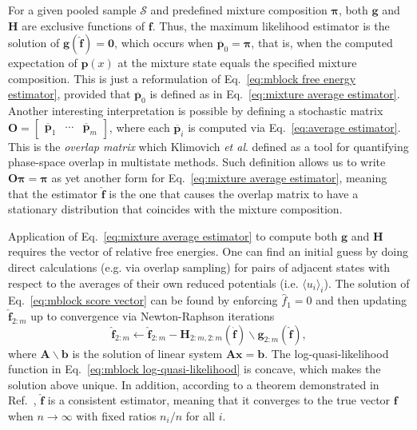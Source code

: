 \documentclass[aip,jcp,reprint,amsmath,amssymb]{revtex4-1}
\newcommand{\mt}[1]{\boldsymbol{\mathbf{#1}}}           %
\newcommand{\vt}[1]{\boldsymbol{\mathbf{#1}}}           %
\begin{document}
For a given pooled sample $\mathcal S$ and predefined mixture composition $\vt \pi$, both $\vt g$ and $\mt H$ are exclusive functions of $\vt f$. Thus, the maximum likelihood estimator is the solution of $\vt g(\hat{\vt f}) = \vt 0$, which occurs when $\overline{\vt p}_0 = \vt \pi$, that is, when the computed expectation of $\vt p(x)$ at the mixture state equals the specified mixture composition. This is just a reformulation of Eq.~\eqref{eq:mblock free energy estimator}, provided that $\overline{\vt p}_0$ is defined as in Eq.~\eqref{eq:mixture average estimator}. Another interesting interpretation is possible by defining a stochastic matrix $\mt O = [\begin{array}{ccc} \overline{\vt p}_1 & \cdots & \overline{\vt p}_m \end{array}]$, where each $\overline{\vt p}_i$ is computed via Eq.~\eqref{eq:average estimator}. This is the \textit{overlap matrix} which Klimovich \textit{et al}.\cite{Klimovich_2015} defined as a tool for quantifying phase-space overlap in multistate methods. Such definition allows us to write $\mt O \vt \pi = \vt \pi$ as yet another form for Eq.~\eqref{eq:mixture average estimator}, meaning that the estimator $\hat{\vt f}$ is the one that causes the overlap matrix to have a stationary distribution that coincides with the mixture composition.

Application of Eq.~\eqref{eq:mixture average estimator} to compute both $\vt g$ and $\mt H$ requires the vector of relative free energies. One can find an initial guess by doing direct calculations (e.g. via overlap sampling\cite{Lee_1980, Lu_2003}) for pairs of adjacent states with respect to the averages of their own reduced potentials (i.e. $\langle u_i \rangle_i$). The solution of Eq.~\eqref{eq:mblock score vector} can be found by enforcing $\hat f_1 = 0$ and then updating $\hat{\vt f}_{2:m}$ up to convergence via Newton-Raphson iterations\cite{Shirts_2008}
\begin{equation*}
\label{eq:mblock Newton-Raphson}
\hat{\vt f}_{2:m} \leftarrow \hat{\vt f}_{2:m} - {\mt H}_{2:m,2:m}(\hat{\vt f}) \backslash {\vt g}_{2:m}(\hat{\vt f}),
\end{equation*}
where $\mt A \backslash \vt b$ is the solution of linear system $\mt A \vt x = \vt b$. The log-quasi-likelihood function in Eq.~\eqref{eq:mblock log-quasi-likelihood} is concave,\cite{Doss_2014} which makes the solution above unique. In addition, according to a theorem demonstrated in Ref.~, $\hat{\vt f}$ is a consistent estimator, meaning that it converges to the true vector $\vt f$ when $n \rightarrow \infty$ with fixed ratios $n_i/n$ for all $i$.
\end{document}
